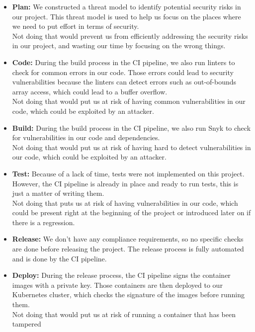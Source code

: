 \documentclass[12pt,x11names]{article}
\begin{document}
\begin{itemize}
    \item \textbf{Plan:} We constructed a threat model to identify potential
    security risks in our project. This threat model is used to help us focus
    on the places where we need to put effort in terms of security.
    \medskip \\
    Not doing that would prevent us from efficiently addressing the security risks
    in our project, and wasting our time by focusing on the wrong things.
    \item \textbf{Code:} During the build process in the CI pipeline, we also run
    linters to check for common errors in our code. Those errors could lead to
    security vulnerabilities because the linters can detect errors such as out-of-bounds
    array access, which could lead to a buffer overflow.
    \medskip \\
    Not doing that would put us at risk of having common vulnerabilities in our code, 
    which could be exploited by an attacker.
    \item \textbf{Build:} During the build process in the CI pipeline, we also run
    Snyk to check for vulnerabilities in our code and dependencies.
    \medskip \\
    Not doing that would put us at risk of having hard to detect vulnerabilities in
    our code, which could be exploited by an attacker.
    \item \textbf{Test:} Because of a lack of time, tests were not implemented on this
    project. However, the CI pipeline is already in place and ready to run tests, this 
    is just a matter of writing them.
    \medskip \\
    Not doing that puts us at risk of having vulnerabilities in our code, which could
    be present right at the beginning of the project or introduced later on if there
    is a regression.
    \item \textbf{Release:} We don't have any compliance requirements, so no specific
    checks are done before releasing the project. The release process is fully automated 
    and is done by the CI pipeline.
    \item \textbf{Deploy:} During the release process, the CI pipeline signs the
    container images with a private key. Those containers are then deployed to our 
    Kubernetes cluster, which checks the signature of the images before running them.
    \medskip \\
    Not doing that would put us at risk of running a container that has been tampered

\end{itemize}
\end{document}
